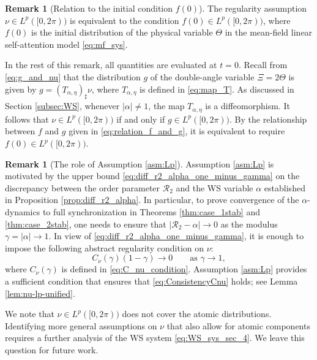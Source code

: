 \documentclass[10pt]{article}
\theoremstyle{definition}
\theoremstyle{definition}
\newtheorem{remark}[theorem]{Remark}
\numberwithin{equation}{section}
\newcommand{\CR}{\mathcal{R}}
\begin{document}
\begin{remark}[Relation to the initial condition $f(0)$]
The regularity assumption $\nu \in L^p([0,2\pi))$ is equivalent to the condition $f(0) \in L^p([0,2\pi))$, where $f(0)$ is the initial distribution of the physical variable $\Theta$ in the mean-field linear self-attention model \eqref{eq:mf_sys}.

In the rest of this remark, all quantities are evaluated at $t=0$.
Recall from \eqref{eq:g_and_nu} that the distribution $g$ of the double-angle variable $\Xi = 2\Theta$ is given by $g = (T_{\alpha, \eta})_{\sharp} \nu$, where $T_{\alpha,\eta}$ is defined in \eqref{eq:map_T}.
As discussed in Section \ref{subsec:WS}, whenever $|\alpha| \neq 1$, the map $T_{\alpha, \eta}$ is a diffeomorphism.
It follows that $\nu \in L^p([0,2\pi))$ if and only if $g \in L^p([0,2\pi))$.
By the relationship between $f$ and $g$ given in \eqref{eq:relation_f_and_g}, it is equivalent to require $f(0) \in L^p([0,2\pi))$.
\end{remark}

\begin{remark}[The role of Assumption \ref{asm:Lp}]
Assumption \ref{asm:Lp} is motivated by the upper bound \eqref{eq:diff_r2_alpha_one_minus_gamma} on the discrepancy between the order parameter $\CR_2$ and the WS variable $\alpha$ established in Proposition \ref{prop:diff_r2_alpha}.
In particular, to prove convergence of the $\alpha$-dynamics to full synchronization in Theorems \ref{thm:case_1stab} and \ref{thm:case_2stab}, one needs to ensure that $|\CR_2 - \alpha| \rightarrow 0$ as the modulus $\gamma = |\alpha| \rightarrow 1$.  
In view of \eqref{eq:diff_r2_alpha_one_minus_gamma}, it is enough to impose the following abstract regularity condition on $\nu$:
\begin{equation}
\label{eq:ConsistencyCnu}
        C_{\nu}(\gamma) (1 - \gamma) \rightarrow 0 \qquad \text{as } \gamma \rightarrow 1,
    \end{equation}
where $C_{\nu}(\gamma)$ is defined in \eqref{eq:C_nu_condition}.
Assumption \ref{asm:Lp} provides a sufficient condition that ensures that \eqref{eq:ConsistencyCnu} holds; see Lemma \ref{lem:nu-lp-unified}. 

We note that $\nu \in L^p([0,2\pi))$ does not cover the atomic distributions.
Identifying more general assumptions on $\nu$ that also allow for atomic components requires a further analysis of the WS system \eqref{eq:WS_sys_sec_4}. We leave this question for future work. 
\end{remark}
\end{document}
